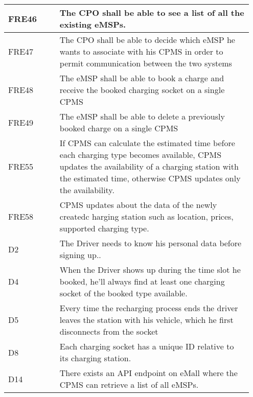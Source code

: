{\begin{longtable}{|p{0.20\linewidth}p{0.75\linewidth}|}
    \hline
    \rowcolor{bluepoli!15}
    FRE46 & The CPO shall be able to see a list of all the existing eMSPs. \\
    \hline
    \rowcolor{bluepoli!15} FRE47 &  The CPO shall be able to decide which eMSP he wants to associate with his CPMS in order to permit communication between the two systems \\
    \hline
    \rowcolor{bluepoli!15} FRE48 & The eMSP shall be able to book a charge and receive the booked charging socket on a single CPMS \\
    \hline
    \rowcolor{bluepoli!15} FRE49 & The eMSP shall be able to delete a previously booked charge on a single CPMS\\
    \hline
    \rowcolor{bluepoli!15} FRE55 & If CPMS can calculate the estimated time before each charging type becomes available, CPMS updates the availability of a charging station with the estimated time, otherwise CPMS updates only the availability. \\
    \hline
    \rowcolor{bluepoli!15} FRE58 & CPMS updates about the data of the newly createdc harging station such as location, prices, supported charging type. \\
    \hline
    \rowcolor{bluepoli!5} D2 &The Driver needs to know his personal data before signing up.. \\
    \hline 
    \rowcolor{bluepoli!5} D4 & When the Driver shows up during the time slot he booked, he’ll always find at least one charging socket of the booked type available. \\
    \hline  
    \rowcolor{bluepoli!5} D5 & Every time the recharging process ends the driver leaves the station with his vehicle, which he first disconnects from the socket \\
    \hline  
    \rowcolor{bluepoli!5} D8 & Each charging socket has a unique ID relative to its charging station. \\
    \hline    
    \rowcolor{bluepoli!5} D14 & There exists an API endpoint on eMall where the CPMS can retrieve a list of all eMSPs. \\
    \hline 
\end{longtable}}
